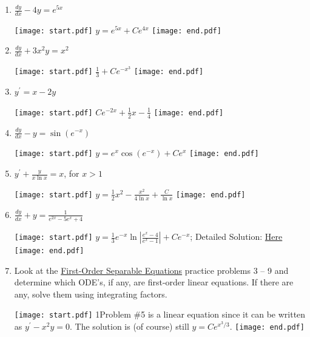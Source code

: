\documentclass[12pt]{article}
\begin{document}
\begin{enumerate}
\setcounter{enumi}{0}

\item $\frac{dy}{dx}-4y=e^{5x}$

\texttt{[image: start.pdf]}
{{$y=e^{5x}+Ce^{4x}$}}
\texttt{[image: end.pdf]}


\item $\frac{dy}{dx}+3x^2y=x^2$

\texttt{[image: start.pdf]}
{{$\frac{1}{3}+Ce^{-x^3}$}}
\texttt{[image: end.pdf]}


\item $y^{\prime}=x-2y$

\texttt{[image: start.pdf]}
{{$Ce^{-2x}+\frac{1}{2}x-\frac{1}{4}$}}
\texttt{[image: end.pdf]}


\item $\frac{dy}{dx}-y=\sin{(e^{-x})}$

\texttt{[image: start.pdf]}
{{$y=e^x\cos{(e^{-x})}+Ce^x$}}
\texttt{[image: end.pdf]}


\item $y^{\prime}+\frac{y}{x\ln{x}}=x$, for $x>1$

\texttt{[image: start.pdf]}
{{$y=\frac{1}{2}x^2-\frac{x^2}{4\ln{x}}+\frac{C}{\ln{x}}$}}
\texttt{[image: end.pdf]}


\item $\frac{dy}{dx}+y=\frac{1}{e^{2x}-5e^x+4}$

\texttt{[image: start.pdf]}
{{$y=\frac{1}{3}e^{-x}\ln{\left|\frac{e^x-4}{e^x-1}\right|+Ce^{-x}}$; Detailed Solution: \textcolor{blue}{\href{http://www.math.drexel.edu/classes/Calculus/resources/Math123HW/Solutions/123_03_Integrating_Factors_06.pdf}{Here}}}}
\texttt{[image: end.pdf]}



\end{enumerate}

\begin{enumerate}
\setcounter{enumi}{6}

\item Look at the \underline{First-Order Separable Equations} practice problems 3 -- 9 and determine which ODE's, if any, are first-order linear equations.  If there are any, solve them using integrating factors.

\texttt{[image: start.pdf]}
{{{1\linewidth}{Problem \#5 is a linear equation since it can be written as $y^{\prime}-x^2y=0$.  The solution is (of course) still $y=Ce^{x^3/3}$.}}}
\texttt{[image: end.pdf]}


\end{enumerate}
\end{document}
